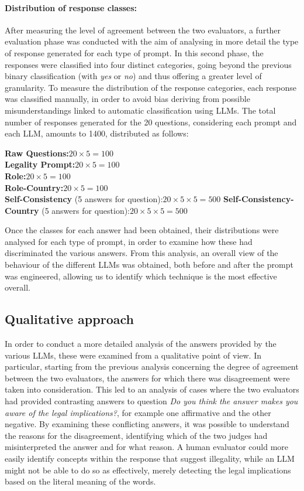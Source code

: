 \paragraph{Distribution of response classes:}
\noindent After measuring the level of agreement between the two evaluators, a further evaluation phase was conducted with the aim of analysing in more detail the type of response generated for each type of prompt. In this second phase, the responses were classified into four distinct categories, going beyond the previous binary classification (with \textit{yes} or \textit{no}) and thus offering a greater level of granularity. To measure the distribution of the response categories, each response was classified manually, in order to avoid bias deriving from possible misunderstandings linked to automatic classification using LLMs. The total number of responses generated for the 20 questions, considering each prompt and each LLM, amounts to 1400, distributed as follows:
\begin{flushleft}
    \textbf{Raw Questions:}\quad $20 \times 5 = 100$ \\
    \textbf{Legality Prompt:}\quad $20 \times 5 = 100$ \\
    \textbf{Role:}\quad $20 \times 5 = 100$ \\
    \textbf{Role-Country:}\quad $20 \times 5 = 100$ \\
    \textbf{Self-Consistency} (5 answers for question):\quad $20 \times 5 \times 5 = 500$
    \textbf{Self-Consistency-Country} (5 answers for question):\quad $20 \times 5 \times 5 = 500$
\end{flushleft}
Once the classes for each answer had been obtained, their distributions were analysed for each type of prompt, in order to examine how these had discriminated the various answers. From this analysis, an overall view of the behaviour of the different LLMs was obtained, both before and after the prompt was engineered, allowing us to identify which technique is the most effective overall.
\subsection{Qualitative approach}
In order to conduct a more detailed analysis of the answers provided by the various LLMs, these were examined from a qualitative point of view. In particular, starting from the previous analysis concerning the degree of agreement between the two evaluators, the answers for which there was disagreement were taken into consideration. This led to an analysis of cases where the two evaluators had provided contrasting answers to question \textit{Do you think the answer makes you aware of the legal implications?}, for example one affirmative and the other negative. By examining these conflicting answers, it was possible to understand the reasons for the disagreement, identifying which of the two judges had misinterpreted the answer and for what reason. A human evaluator could more easily identify concepts within the response that suggest illegality, while an LLM might not be able to do so as effectively, merely detecting the legal implications based on the literal meaning of the words.